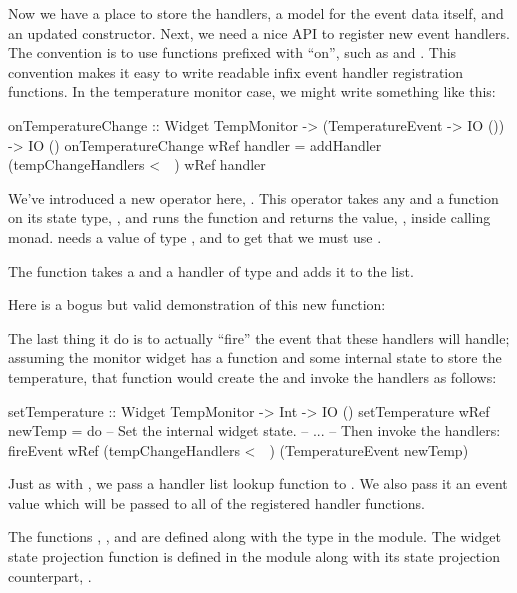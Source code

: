 Now we have a place to store the handlers, a model for the event data
itself, and an updated constructor.  Next, we need a nice API to
register new event handlers.  The  convention is to use
functions prefixed with ``on'', such as  and
.  This convention makes it easy to write readable
infix event handler registration functions.  In the temperature
monitor case, we might write something like this:

\begin{haskellcode}
 onTemperatureChange :: Widget TempMonitor
                     -> (TemperatureEvent -> IO ())
                     -> IO ()
 onTemperatureChange wRef handler =
   addHandler (tempChangeHandlers <~~) wRef handler
\end{haskellcode}

We've introduced a new operator here, \fw{<\string~\string~}.  This
operator takes any  and a function on its state type,
, and runs the function and returns the value, ,
inside calling monad.   needs a value of type
, and to get that we must use
\fw{<\string~\string~}.

The  function takes a  and a handler of
type  and adds it to the  list.

Here is a bogus but valid demonstration of this new function:


The last thing it do is to actually ``fire'' the event that these
handlers will handle; assuming the monitor widget has a
 function and some internal state to store the
temperature, that function would create the  and
invoke the handlers as follows:

\begin{haskellcode}
 setTemperature :: Widget TempMonitor -> Int -> IO ()
 setTemperature wRef newTemp = do
   -- Set the internal widget state.
   -- ...
   -- Then invoke the handlers:
   fireEvent wRef (tempChangeHandlers <~~) (TemperatureEvent newTemp)
\end{haskellcode}

Just as with , we pass a handler list lookup function
to .  We also pass it an event value which will be
passed to all of the registered handler functions.

The functions , , and 
are defined along with the  type in the 
module.  The widget state projection function \fw{<\string~\string~}
is defined in the  module along with its 
state projection counterpart, \fw{<\string~}.
